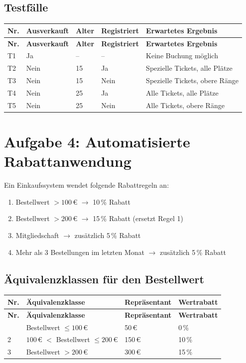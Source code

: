 \documentclass[
	fontsize=12pt,          %
	paper=a4,               %
	numbers=noenddot,       %
	listof=totoc,           %
	listof=entryprefix,     %
	listof=nochaptergap,    %
	bibliography=totoc,     %
	parskip=half,           %
	openany                 %
]{scrbook}
\begin{document}
\section*{Testfälle}

\begin{longtable}{| p{0.5cm} | p{2.0cm} | p{1.2cm} | p{1.8cm} | p{5.5cm} |}
	\hline
	\textbf{Nr.} & \textbf{Ausverkauft} & \textbf{Alter} & \textbf{Registriert} & \textbf{Erwartetes Ergebnis} \\ \hline
	\endfirsthead
	\hline
	\textbf{Nr.} & \textbf{Ausverkauft} & \textbf{Alter} & \textbf{Registriert} & \textbf{Erwartetes Ergebnis} \\ \hline
	\endhead
	\hline
	\endfoot
	T1 & Ja & -- & -- & Keine Buchung möglich \\ \hline
	T2 & Nein & 15 & Ja & Spezielle Tickets, alle Plätze \\ \hline
	T3 & Nein & 15 & Nein & Spezielle Tickets, obere Ränge \\ \hline
	T4 & Nein & 25 & Ja & Alle Tickets, alle Plätze \\ \hline
	T5 & Nein & 25 & Nein & Alle Tickets, obere Ränge \\ \hline
\end{longtable}


\chapter*{Aufgabe 4: Automatisierte Rabattanwendung}

Ein Einkaufssystem wendet folgende Rabattregeln an:
\begin{enumerate}
	\item Bestellwert $> 100$\,€ $\rightarrow$ 10\,\% Rabatt
	\item Bestellwert $> 200$\,€ $\rightarrow$ 15\,\% Rabatt (ersetzt Regel 1)
	\item Mitgliedschaft $\rightarrow$ zusätzlich 5\,\% Rabatt
	\item Mehr als 3 Bestellungen im letzten Monat $\rightarrow$ zusätzlich 5\,\% Rabatt
\end{enumerate}

\section*{Äquivalenzklassen für den Bestellwert}

\begin{longtable}{| p{0.5cm} | p{5.0cm} | p{2.5cm} | p{3.5cm} |}
	\hline
	\textbf{Nr.} & \textbf{Äquivalenzklasse} & \textbf{Repräsentant} & \textbf{Wertrabatt} \\ \hline
	\endfirsthead
	\hline
	\textbf{Nr.} & \textbf{Äquivalenzklasse} & \textbf{Repräsentant} & \textbf{Wertrabatt} \\ \hline
	\endhead
	\hline
	\endfoot
	1 & Bestellwert $\leq 100$\,€ & 50\,€ & 0\,\% \\ \hline
	2 & $100$\,€ $<$ Bestellwert $\leq 200$\,€ & 150\,€ & 10\,\% \\ \hline
	3 & Bestellwert $> 200$\,€ & 300\,€ & 15\,\% \\ \hline
\end{longtable}
\end{document}
